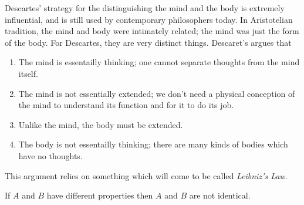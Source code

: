 Descartes' strategy for the distinguishing the mind and the body is extremely influential, and is still used by contemporary philosophers today. In Aristotelian tradition, the mind and body were intimately related; the mind was just the form of the body. For Descartes, they are very distinct things. Descaret's argues that
\begin{enumerate}
\item The mind is essentailly thinking; one cannot separate thoughts from the mind itself.
\item The mind is not essentially extended; we don't need a physical conception of the mind to understand its function and for it to do its job.
\item Unlike the mind, the body must be extended.
\item The body is not essentailly thinking; there are many kinds of bodies which have no thoughts.
\end{enumerate}
This argument relies on something which will come to be called \emph{Leibniz's Law}.

\begin{theorem}
If $A$ and $B$ have different properties then $A$ and $B$ are not identical.
\end{theorem}